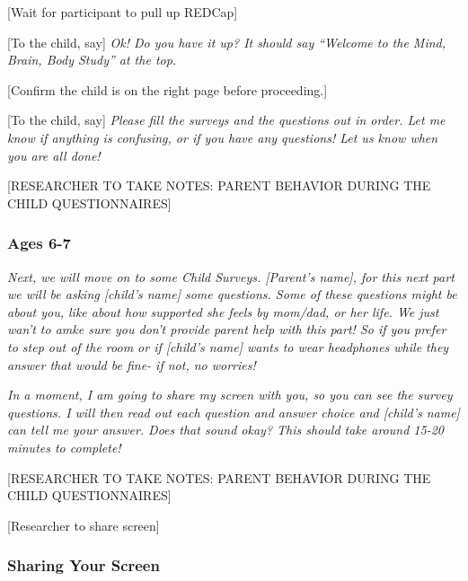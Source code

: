\documentclass[]{book}
\begin{document}
{[}Wait for participant to pull up REDCap{]}

{[}To the child, say{]} \emph{Ok! Do you have it up? It should say ``Welcome to the Mind, Brain, Body Study'' at the top.}

{[}Confirm the child is on the right page before proceeding.{]}

{[}To the child, say{]} \emph{Please fill the surveys and the questions out in order. Let me know if anything is confusing, or if you have any questions! Let us know when you are all done!}

{[}RESEARCHER TO TAKE NOTES: PARENT BEHAVIOR DURING THE CHILD QUESTIONNAIRES{]}

\hypertarget{ages-6-7}{%
\subsubsection{Ages 6-7}\label{ages-6-7}}

\emph{Next, we will move on to some Child Surveys. {[}Parent's name{]}, for this next part we will be asking {[}child's name{]} some questions. Some of these questions might be about you, like about how supported she feels by mom/dad, or her life. We just wan't to amke sure you don't provide parent help with this part! So if you prefer to step out of the room or if {[}child's name{]} wants to wear headphones while they answer that would be fine- if not, no worries!}

\emph{In a moment, I am going to share my screen with you, so you can see the survey questions. I will then read out each question and answer choice and {[}child's name{]} can tell me your answer. Does that sound okay? This should take around 15-20 minutes to complete!}

{[}RESEARCHER TO TAKE NOTES: PARENT BEHAVIOR DURING THE CHILD QUESTIONNAIRES{]}

{[}Researcher to share screen{]}

\hypertarget{sharing-your-screen}{%
\subsubsection{Sharing Your Screen}\label{sharing-your-screen}}
\end{document}
